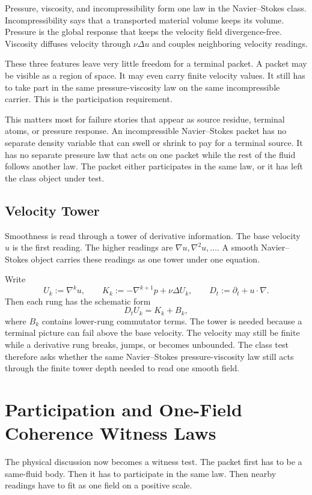 \documentclass[11pt]{article}
\begin{document}
Pressure, viscosity, and incompressibility form one law in the Navier--Stokes class.
Incompressibility says that a transported material volume keeps its volume.
Pressure is the global response that keeps the velocity field divergence-free.
Viscosity diffuses velocity through \(\nu\Delta u\) and couples neighboring velocity readings.

These three features leave very little freedom for a terminal packet.
A packet may be visible as a region of space.
It may even carry finite velocity values.
It still has to take part in the same pressure-viscosity law on the same incompressible carrier.
This is the participation requirement.

This matters most for failure stories that appear as source residue, terminal atoms, or pressure response.
An incompressible Navier--Stokes packet has no separate density variable that can swell or shrink to pay for a terminal source.
It has no separate pressure law that acts on one packet while the rest of the fluid follows another law.
The packet either participates in the same law, or it has left the class object under test.

\subsection{Velocity Tower}

Smoothness is read through a tower of derivative information.
The base velocity \(u\) is the first reading.
The higher readings are \(\nabla u,\nabla^2u,\ldots\).
A smooth Navier--Stokes object carries these readings as one tower under one equation.

Write
\[
  U_k:=\nabla^k u,
  \qquad
  K_k:=-\nabla^{k+1}p+\nu\Delta U_k,
  \qquad
  D_t:=\partial_t+u\cdot\nabla.
\]
Then each rung has the schematic form
\[
  D_tU_k=K_k+B_k,
\]
where \(B_k\) contains lower-rung commutator terms.
The tower is needed because a terminal picture can fail above the base velocity.
The velocity may still be finite while a derivative rung breaks, jumps, or becomes unbounded.
The class test therefore asks whether the same Navier--Stokes pressure-viscosity law still acts through the finite tower depth needed to read one smooth field.

\section{Participation and One-Field Coherence Witness Laws}

The physical discussion now becomes a witness test.
The packet first has to be a same-fluid body.
Then it has to participate in the same law.
Then nearby readings have to fit as one field on a positive scale.
\end{document}
